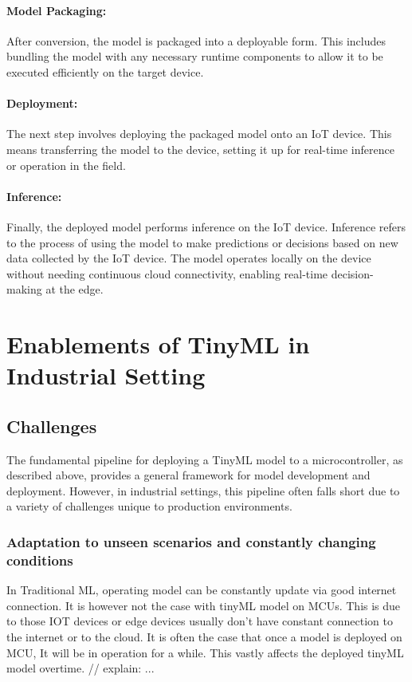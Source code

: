 \documentclass[twocolumn]{article}
\begin{document}
\paragraph{Model Packaging:}
	After conversion, the model is packaged into a deployable form. This includes bundling the model with any necessary runtime components to allow it to be executed efficiently on the target device.\\[0.25cm]
\paragraph{Deployment:}
	The next step involves deploying the packaged model onto an IoT device. This means transferring the model to the device, setting it up for real-time inference or operation in the field.\\[0.25cm]
\paragraph{Inference:}
	Finally, the deployed model performs inference on the IoT device. Inference refers to the process of using the model to make predictions or decisions based on new data collected by the IoT device. The model operates locally on the device without needing continuous cloud connectivity, enabling real-time decision-making at the edge.\\[0.25cm]



\section{Enablements of TinyML in Industrial Setting}
\label{prod_tinyml}

\subsection{Challenges}

The fundamental pipeline for deploying a TinyML model to a microcontroller, as described above, provides a general framework for model development and deployment. However, in industrial settings, this pipeline often falls short due to a variety of challenges unique to production environments.

\subsubsection{Adaptation to unseen scenarios and constantly changing conditions}
In Traditional ML, operating model can be constantly update via good internet connection. It is however not the case with tinyML model on MCUs. This is due to those IOT devices or edge devices usually don't have constant connection to the internet or to the cloud. It is often the case that once a model is deployed on MCU, It will be in operation for a while.
This vastly affects the deployed tinyML model overtime. // explain: ... 
\end{document}
